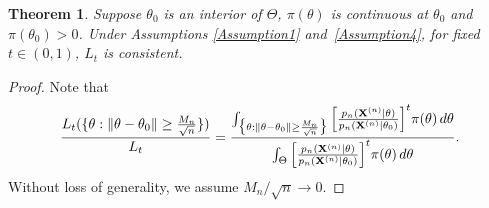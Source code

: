 \documentclass[3p]{elsarticle}
\theoremstyle{plain}
\newtheorem{theorem}{\quad\quad Theorem}
\theoremstyle{definition}
\theoremstyle{remark}
\begin{document}
\begin{theorem}
    Suppose $\theta_0$ is an interior of $\Theta$, $\pi(\theta)$ is continuous at $\theta_0$ and $\pi(\theta_0)>0$.
    Under Assumptions \ref{Assumption1} and~\ref{Assumption4}, for fixed $t\in(0,1)$, $L_t$ is consistent.
\end{theorem}
\begin{proof}
    Note that
       \begin{equation}\label{eq:numden}
       \frac{L_{t} (\{\theta: \|\theta-\theta_0\|\geq \frac{M_n}{\sqrt{n}}\})}
           {L_{t}}
=
    \frac{
        \int_{\big\{\theta: \|\theta-\theta_0\|\geq \frac{M_n}{\sqrt{n}}\big\}} \Big[ \frac{p_n(\mathbf{X}^{(n)}|\theta)}{p_n(\mathbf{X}^{(n)}|\theta_0)} \Big]^{t} \pi(\theta) \, d \theta
    }{
        \int_{\Theta} \Big[ \frac{p_n(\mathbf{X}^{(n)}|\theta)}{p_n(\mathbf{X}^{(n)}|\theta_0)} \Big]^{t} \pi(\theta) \, d \theta
    }.
       \end{equation}
    Without loss of generality, we assume ${M_n}/{\sqrt{n}}\to 0$.


\end{proof}
\end{document}
